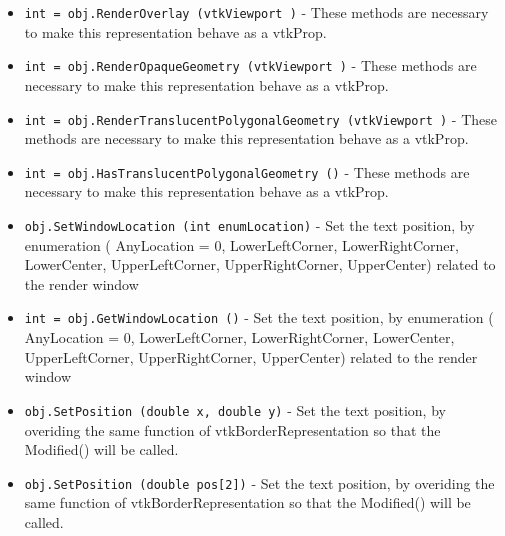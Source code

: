 \begin{itemize}
\item  \verb|int = obj.RenderOverlay (vtkViewport )| -  These methods are necessary to make this representation behave as
 a vtkProp.

\item  \verb|int = obj.RenderOpaqueGeometry (vtkViewport )| -  These methods are necessary to make this representation behave as
 a vtkProp.

\item  \verb|int = obj.RenderTranslucentPolygonalGeometry (vtkViewport )| -  These methods are necessary to make this representation behave as
 a vtkProp.

\item  \verb|int = obj.HasTranslucentPolygonalGeometry ()| -  These methods are necessary to make this representation behave as
 a vtkProp.

\item  \verb|obj.SetWindowLocation (int enumLocation)| -  Set the text position, by enumeration (
 AnyLocation = 0,
 LowerLeftCorner,
 LowerRightCorner,
 LowerCenter,
 UpperLeftCorner,
 UpperRightCorner,
 UpperCenter)
 related to the render window

\item  \verb|int = obj.GetWindowLocation ()| -  Set the text position, by enumeration (
 AnyLocation = 0,
 LowerLeftCorner,
 LowerRightCorner,
 LowerCenter,
 UpperLeftCorner,
 UpperRightCorner,
 UpperCenter)
 related to the render window

\item  \verb|obj.SetPosition (double x, double y)| -  Set the text position, by overiding the same function of
 vtkBorderRepresentation so that the Modified() will be called.

\item  \verb|obj.SetPosition (double pos[2])| -  Set the text position, by overiding the same function of
 vtkBorderRepresentation so that the Modified() will be called.

\end{itemize}
